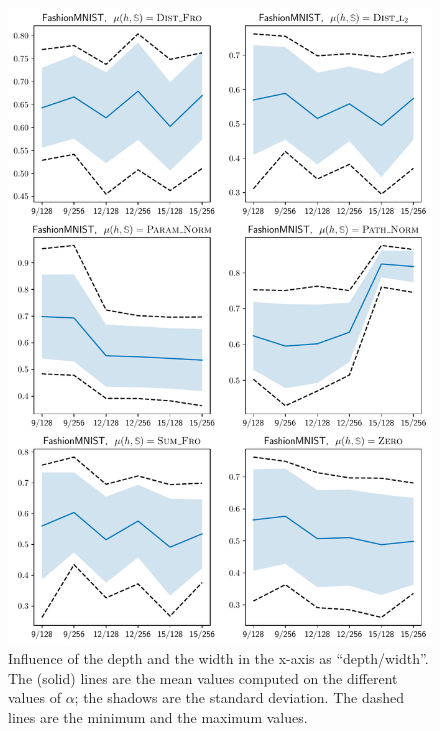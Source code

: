 \begin{noaddcontents}
\begin{figure}
    \centering
    \includegraphics[width=0.77\linewidth]{chapter_7/figures/influence_depth_fashion.pdf}
    \caption{
    Influence of the depth and the width in the x-axis as ``depth/width''.
    The (solid) lines are the mean values computed on the different values of $\alpha$; the shadows are the standard deviation. 
    The dashed lines are the minimum and the maximum values.
    }
    \label{ap:dis-mu:fig:influence-depth-3}
\end{figure}


\end{noaddcontents}
